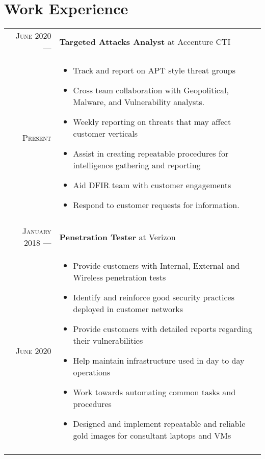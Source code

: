 \documentclass[a4paper,10pt]{article}
\begin{document}
\section{Work Experience}
\begin{tabular}{r|p{11cm}}

 \textsc{June 2020} ---            & \textbf {Targeted Attacks Analyst} at Accenture CTI \\
 \textsc{Present} \hphantom{---} & \footnotesize{
        \vspace{-2mm}
        \begin{itemize}[leftmargin=*]
            \item Track and report on APT style threat groups
            \item Cross team collaboration with Geopolitical, Malware, and Vulnerability analysts. 
            \item Weekly reporting on threats that may affect customer verticals
            \item Assist in creating repeatable procedures for intelligence gathering and reporting
            \item Aid DFIR team with customer engagements
            \item Respond to customer requests for information. 
        \end{itemize}
        \vspace*{-\baselineskip}
    }\\
 \multicolumn{2}{c}{} \\

 \textsc{January 2018} ---            & \textbf {Penetration Tester} at Verizon \\
 \textsc{June 2020} \hphantom{---} & \footnotesize{
        \vspace{-2mm}
        \begin{itemize}[leftmargin=*]
            \item Provide customers with Internal, External and Wireless penetration tests
            \item Identify and reinforce good security practices deployed in customer networks
            \item Provide customers with detailed reports regarding their vulnerabilities
            \item Help maintain infrastructure used in day to day operations
            \item Work towards automating common tasks and procedures
            \item Designed and implement repeatable and reliable gold images for consultant laptops and VMs
        \end{itemize}
        \vspace*{-\baselineskip}
    }\\
 \multicolumn{2}{c}{} \\


\end{tabular}
\end{document}
